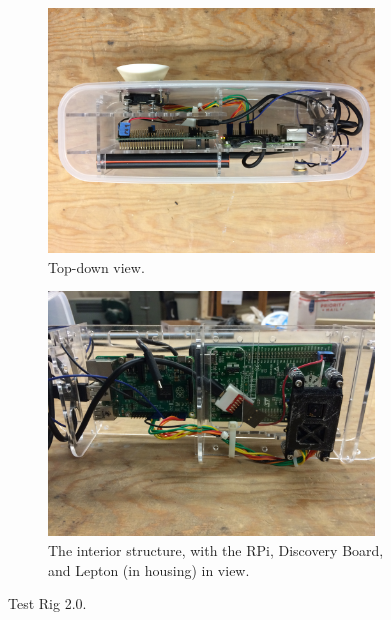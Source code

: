 \begin{figure}[h]
\centering
\begin{subfigure}{0.4\textwidth}
 \centering
 \includegraphics[width=0.95\textwidth, angle= 180]{"./image/testrig2_top"}
 \caption{Top-down view.}
 \label{fig:testrig2_testing:sub1}
\end{subfigure}
\begin{subfigure}{0.4\textwidth}
 \centering
 \includegraphics[width=0.95\textwidth, angle= 180]{"./image/testrig2_interior"}
 \caption{The interior structure, with the RPi, Discovery Board, and Lepton (in housing) in view.}
 \label{fig:testrig2_testing:sub2}
\end{subfigure}
\caption{Test Rig 2.0.}
\label{fig:testrig2_testing}
\end{figure}

